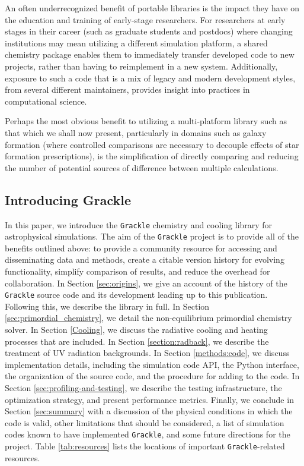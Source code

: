 An often underrecognized benefit of portable libraries
is the impact they have on the education and training of early-stage researchers.
For researchers at early stages in their career (such as graduate students and
postdocs) where changing institutions may mean utilizing a different simulation
platform, a shared chemistry package enables them to immediately transfer
developed code to new projects, rather than having to reimplement in a new
system.  Additionally, exposure to such a code that is a mix
of legacy and modern development styles, from several different maintainers,
provides insight into practices in computational science.

Perhaps the most obvious benefit to utilizing a multi-platform library such as
that which we shall now present, particularly in domains such as galaxy formation (where
controlled comparisons are necessary to decouple effects of star formation
prescriptions), is the simplification of directly comparing and reducing the
number of potential sources of difference between multiple calculations.

\subsection{Introducing Grackle}

In this paper, we introduce the \texttt{Grackle} chemistry and cooling
library for astrophysical simulations.  The aim of the
\texttt{Grackle} project is to provide all of the benefits outlined
above: to provide a community resource for accessing and disseminating
data and methods, create a citable version history for evolving
functionality, simplify comparison of results, and reduce the overhead
for collaboration.  In Section \ref{sec:origins}, we give an account
of the history of the \texttt{Grackle} source code and its development
leading up to this publication.  Following this, we describe the
library in full.  In Section \ref{sec:primordial_chemistry}, we detail
the non-equilibrium primordial chemistry solver.  In Section
\ref{Cooling}, we discuss the radiative cooling and heating processes
that are included.  In Section \ref{section:radback}, we describe
the treatment of UV radiation backgrounds.  In Section
\ref{methods:code}, we discuss implementation details, including the
simulation code API, the Python interface, the organization of
the source code, and the procedure for adding to the code.  In Section
\ref{sec:profiling-and-testing}, we describe the testing
infrastructure, the optimization strategy, and present performance
metrics.  Finally, we conclude in Section \ref{sec:summary} with a
discussion of the physical conditions in which the code is valid,
other limitations that should be considered, a list of simulation
codes known to have implemented \texttt{Grackle}, and some future
directions for the project.  Table \ref{tab:resources} lists the
locations of important \texttt{Grackle}-related resources.

